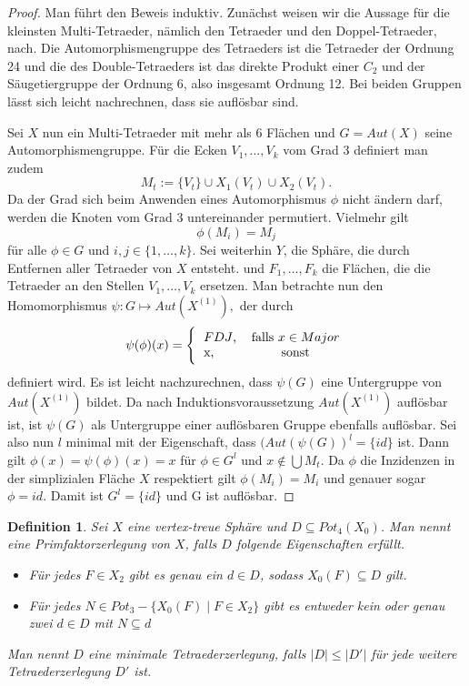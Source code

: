\documentclass[12pt,titlepage,twoside,cleardoublepage]{article}
\theoremstyle{nummermitklammern}
\newtheorem{definition}[temp]{Definition}
\newtheorem{definition}[zahl]{Definition}
\numberwithin{equation}{section}
\begin{document}
\begin{proof}
Man führt den Beweis induktiv. Zunächst weisen wir die Aussage für die kleinsten Multi-Tetraeder, nämlich den Tetraeder und den Doppel-Tetraeder, nach. Die Automorphismengruppe des Tetraeders ist die Tetraeder  der Ordnung 24 und die des Double-Tetraeders ist das direkte Produkt einer $C_2$ und der Säugetiergruppe der Ordnung 6, also insgesamt Ordnung 12. Bei beiden Gruppen lässt sich leicht nachrechnen, dass sie auflösbar sind.

Sei $X$ nun ein Multi-Tetraeder mit mehr als  6 Flächen und $G=Aut(X)$ seine Automorphismengruppe. Für die Ecken $V_1,\ldots,V_k$ vom Grad $3$ definiert man zudem 
\[
M_t:=\{V_t\} \cup X_1(V_t) \cup X_2(V_t).  
\] 
Da der Grad sich beim Anwenden eines Automorphismus $\phi$ nicht ändern darf, werden die Knoten vom Grad 3 untereinander permutiert. Vielmehr gilt 
\[
\phi(M_i)=M_j 
\]
für alle $\phi \in G$ und $i,j\in \{1,\ldots,k\}.$ Sei weiterhin $Y$, die Sphäre, die durch Entfernen aller Tetraeder von $X$ entsteht. und $F_1,\ldots,F_k$ die Flächen, die die Tetraeder an den Stellen $V_1,\ldots,V_k$ ersetzen. Man betrachte nun den Homomorphismus $\psi:G\mapsto Aut(X^{(1)}),$ der durch  
\[
\psi(\phi)(x)=\Biggl\{
\begin{tabular}[l]{lcr}
$FDJ$,&\textcolor{black}{ falls $ x\in Major$} \\
x,& sonst\\
\end{tabular}
\]
definiert wird. Es ist leicht nachzurechnen, dass $\psi(G)$ eine Untergruppe von $Aut(X^{(1)})$ bildet. Da nach Induktionsvoraussetzung $Aut(X^{(1)})$ auflösbar ist, ist $\psi(G)$ als Untergruppe einer auflösbaren Gruppe ebenfalls auflösbar. 
Sei also nun $l$ minimal mit der Eigenschaft, dass $(Aut(\psi(G))^l=\{id\}$ ist. Dann gilt $\phi(x)=\psi(\phi)(x)=x$ für $\phi \in G^l$ und $x\notin \bigcup M_t$. Da $\phi$ die Inzidenzen in der simplizialen Fläche $X$ respektiert gilt $\phi(M_i)=M_i$ und genauer sogar $\phi=id.$ Damit ist $G^l =\{id\}$ und G ist auflösbar.
  
\end{proof}

\begin{definition}
Sei $X$ eine vertex-treue Sphäre und $D\subseteq Pot_4(X_0)$. Man nennt eine Primfaktorzerlegung von $X$, falls $D$ folgende Eigenschaften erfüllt.
\begin{itemize}
\item Für jedes $F\in X_2$ gibt es genau ein $d\in D$, sodass $X_0(F) \subseteq D$ gilt.
\item Für jedes $N\in Pot_3-\{X_0(F)\mid F\in X_2\}$ gibt es entweder kein oder genau zwei $d\in D$ mit $N\subseteq d$
\end{itemize}
Man nennt $D$ eine minimale Tetraederzerlegung, falls $\vert D \vert\leq \vert D' \vert$ für jede weitere Tetraederzerlegung $D'$ ist.
\end{definition}
\end{document}
